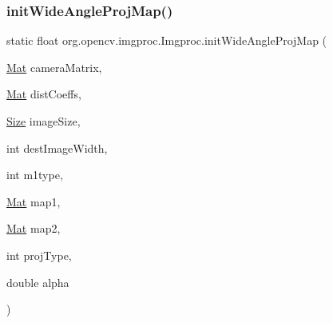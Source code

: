 \subsubsection{\texorpdfstring{init\+Wide\+Angle\+Proj\+Map()}{initWideAngleProjMap()}\hspace{0.1cm}{\footnotesize\ttfamily [1/2]}}
{\footnotesize\ttfamily static float org.\+opencv.\+imgproc.\+Imgproc.\+init\+Wide\+Angle\+Proj\+Map (\begin{DoxyParamCaption}\item[{\mbox{\hyperlink{classorg_1_1opencv_1_1core_1_1_mat}{Mat}}}]{camera\+Matrix,  }\item[{\mbox{\hyperlink{classorg_1_1opencv_1_1core_1_1_mat}{Mat}}}]{dist\+Coeffs,  }\item[{\mbox{\hyperlink{classorg_1_1opencv_1_1core_1_1_size}{Size}}}]{image\+Size,  }\item[{int}]{dest\+Image\+Width,  }\item[{int}]{m1type,  }\item[{\mbox{\hyperlink{classorg_1_1opencv_1_1core_1_1_mat}{Mat}}}]{map1,  }\item[{\mbox{\hyperlink{classorg_1_1opencv_1_1core_1_1_mat}{Mat}}}]{map2,  }\item[{int}]{proj\+Type,  }\item[{double}]{alpha }\end{DoxyParamCaption})\hspace{0.3cm}{\ttfamily [static]}}

\mbox{\label{classorg_1_1opencv_1_1imgproc_1_1_imgproc_a2e0a674f9382040bad9b7f245cdb1bbd}} 
